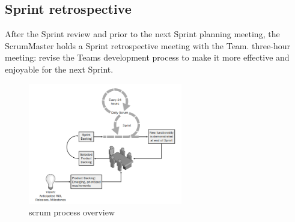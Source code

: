 \subsection*{Sprint retrospective}
After the Sprint review and prior to the next Sprint planning meeting, the ScrumMaster holds a Sprint retrospective meeting with the Team. three-hour meeting: revise the Teams development process to make it more effective and enjoyable for the next Sprint. 

\begin{figure}[H]
  \centering
  \includegraphics[width=0.6\textwidth]{./figures/scrum_process_overview.PNG}
  \caption{scrum process overview}
  \label{fig:ch1-scrum_process_overview}
\end{figure}\bigskip



